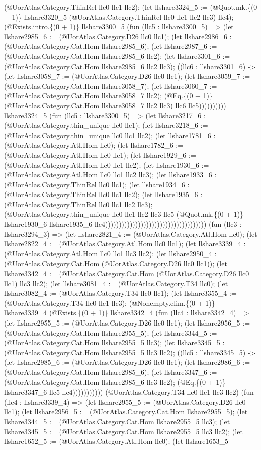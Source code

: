 \documentclass[11pt]{article}
\begin{document}
(@UorAtlas.Category.ThinRel llc0 llc1 llc2); (let llshare3324\_5 := (@Quot.mk.\{(0 + 1)\} llshare3320\_5 (@UorAtlas.Category.ThinRel llc0 llc1 llc2 llc3) llc4); (@Exists.intro.\{(0 + 1)\} llshare3300\_5 (fun (llc5 : llshare3300\_5) => (let llshare2985\_6 := (@UorAtlas.Category.D26 llc0 llc1); (let llshare2986\_6 := (@UorAtlas.Category.Cat.Hom llshare2985\_6); (let llshare2987\_6 := (@UorAtlas.Category.Cat.Hom llshare2985\_6 llc2); (let llshare3301\_6 := (@UorAtlas.Category.Cat.Hom llshare2985\_6 llc2 llc3); ((llc6 : llshare3301\_6) -> (let llshare3058\_7 := (@UorAtlas.Category.D26 llc0 llc1); (let llshare3059\_7 := (@UorAtlas.Category.Cat.Hom llshare3058\_7); (let llshare3060\_7 := (@UorAtlas.Category.Cat.Hom llshare3058\_7 llc2); (@Eq.\{(0 + 1)\} (@UorAtlas.Category.Cat.Hom llshare3058\_7 llc2 llc3) llc6 llc5)))))))))) llshare3324\_5 (fun (llc5 : llshare3300\_5) => (let llshare3217\_6 := (@UorAtlas.Category.thin\_unique llc0 llc1); (let llshare3218\_6 := (@UorAtlas.Category.thin\_unique llc0 llc1 llc2); (let llshare1781\_6 := (@UorAtlas.Category.Atl.Hom llc0); (let llshare1782\_6 := (@UorAtlas.Category.Atl.Hom llc0 llc1); (let llshare1929\_6 := (@UorAtlas.Category.Atl.Hom llc0 llc1 llc2); (let llshare1930\_6 := (@UorAtlas.Category.Atl.Hom llc0 llc1 llc2 llc3); (let llshare1933\_6 := (@UorAtlas.Category.ThinRel llc0 llc1); (let llshare1934\_6 := (@UorAtlas.Category.ThinRel llc0 llc1 llc2); (let llshare1935\_6 := (@UorAtlas.Category.ThinRel llc0 llc1 llc2 llc3); (@UorAtlas.Category.thin\_unique llc0 llc1 llc2 llc3 llc5 (@Quot.mk.\{(0 + 1)\} llshare1930\_6 llshare1935\_6 llc4))))))))))))))))))))))))))))))))))))) (fun (llc3 : llshare3294\_3) => (let llshare2821\_4 := (@UorAtlas.Category.Atl.Hom llc0); (let llshare2822\_4 := (@UorAtlas.Category.Atl.Hom llc0 llc1); (let llshare3339\_4 := (@UorAtlas.Category.Atl.Hom llc0 llc1 llc3 llc2); (let llshare2950\_4 := (@UorAtlas.Category.Cat.Hom (@UorAtlas.Category.D26 llc0 llc1)); (let llshare3342\_4 := (@UorAtlas.Category.Cat.Hom (@UorAtlas.Category.D26 llc0 llc1) llc3 llc2); (let llshare3081\_4 := (@UorAtlas.Category.T34 llc0); (let llshare3082\_4 := (@UorAtlas.Category.T34 llc0 llc1); (let llshare3355\_4 := (@UorAtlas.Category.T34 llc0 llc1 llc3); (@Nonempty.elim.\{(0 + 1)\} llshare3339\_4 (@Exists.\{(0 + 1)\} llshare3342\_4 (fun (llc4 : llshare3342\_4) => (let llshare2955\_5 := (@UorAtlas.Category.D26 llc0 llc1); (let llshare2956\_5 := (@UorAtlas.Category.Cat.Hom llshare2955\_5); (let llshare3344\_5 := (@UorAtlas.Category.Cat.Hom llshare2955\_5 llc3); (let llshare3345\_5 := (@UorAtlas.Category.Cat.Hom llshare2955\_5 llc3 llc2); ((llc5 : llshare3345\_5) -> (let llshare2985\_6 := (@UorAtlas.Category.D26 llc0 llc1); (let llshare2986\_6 := (@UorAtlas.Category.Cat.Hom llshare2985\_6); (let llshare3347\_6 := (@UorAtlas.Category.Cat.Hom llshare2985\_6 llc3 llc2); (@Eq.\{(0 + 1)\} llshare3347\_6 llc5 llc4))))))))))) (@UorAtlas.Category.T34 llc0 llc1 llc3 llc2) (fun (llc4 : llshare3339\_4) => (let llshare2955\_5 := (@UorAtlas.Category.D26 llc0 llc1); (let llshare2956\_5 := (@UorAtlas.Category.Cat.Hom llshare2955\_5); (let llshare3344\_5 := (@UorAtlas.Category.Cat.Hom llshare2955\_5 llc3); (let llshare3345\_5 := (@UorAtlas.Category.Cat.Hom llshare2955\_5 llc3 llc2); (let llshare1652\_5 := (@UorAtlas.Category.Atl.Hom llc0); (let llshare1653\_5 
\end{document}
